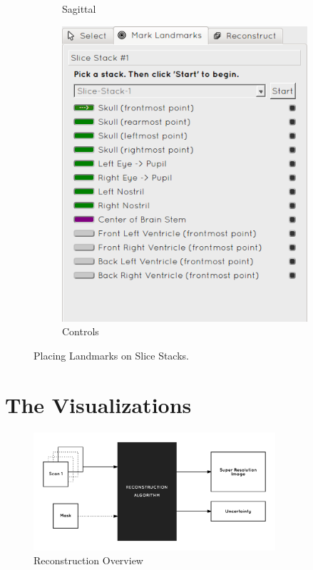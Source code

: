 \begin{figure}[H]
\begin{subfigure}[b]{0.358\textwidth}
    \caption*{Sagittal}
    \label{fig:reconstructionsagittal}
  \end{subfigure}%
  \begin{subfigure}[b]{0.283\textwidth}
    \includegraphics[width=\textwidth]{images/reconstruction/controls.png}
    \caption*{Controls}
    \label{fig:reconstructioncontrols}
  \end{subfigure}
  \caption{Placing Landmarks on Slice Stacks.}\label{fig:reconstructionlandmarks}
\end{figure}

\newpage
\chapter{The Visualizations}\label{sectiontoolvisualization}

\begin{figure}[h]
  \centering
  \includegraphics[width=0.8\textwidth]{images/reconstruction_overview.png}
  \caption{Reconstruction Overview}
  \label{fig:erosionbefore}
\end{figure}

